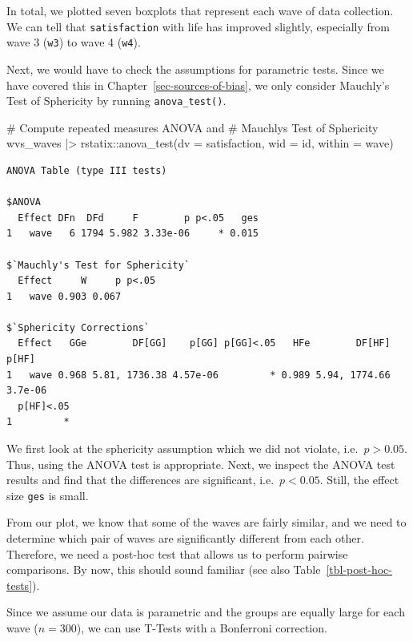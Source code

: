 \documentclass[
  letterpaper,
]{krantz}
\makeatletter
\newenvironment{Shaded}{\begin{snugshade}}{\end{snugshade}}
\newcommand{\AttributeTok}[1]{\textcolor[rgb]{0.40,0.45,0.13}{#1}}
\newcommand{\CommentTok}[1]{\textcolor[rgb]{0.37,0.37,0.37}{#1}}
\newcommand{\FunctionTok}[1]{\textcolor[rgb]{0.28,0.35,0.67}{#1}}
\newcommand{\NormalTok}[1]{\textcolor[rgb]{0.00,0.23,0.31}{#1}}
\newcommand{\SpecialCharTok}[1]{\textcolor[rgb]{0.37,0.37,0.37}{#1}}
\newenvironment{kframe}{%
\medskip{}
\setlength{\fboxsep}{.8em}
 \def\at@end@of@kframe{}%
 \ifinner\ifhmode%
  \def\at@end@of@kframe{\end{minipage}}%
  \begin{minipage}{\columnwidth}%
 \fi\fi%
 \def\FrameCommand##1{\hskip\@totalleftmargin \hskip-\fboxsep
 \colorbox{shadecolor}{##1}\hskip-\fboxsep
     \hskip-\linewidth \hskip-\@totalleftmargin \hskip\columnwidth}%
 \MakeFramed {\advance\hsize-\width
   \@totalleftmargin\z@ \linewidth\hsize
   \@setminipage}}%
 {\par\unskip\endMakeFramed%
 \at@end@of@kframe}
\renewenvironment{Shaded}{\begin{kframe}}{\end{kframe}}
\makeatother
\begin{document}
In total, we plotted seven boxplots that represent each wave of data
collection. We can tell that \texttt{satisfaction} with life has
improved slightly, especially from wave 3 (\texttt{w3}) to wave 4
(\texttt{w4}).

Next, we would have to check the assumptions for parametric tests. Since
we have covered this in Chapter~\ref{sec-sources-of-bias}, we only
consider Mauchly's Test of Sphericity by running \texttt{anova\_test()}.

\begin{Shaded}
\begin{Highlighting}[]
\CommentTok{\# Compute repeated measures ANOVA and}
\CommentTok{\# Mauchly\textquotesingle{}s Test of Sphericity}
\NormalTok{wvs\_waves }\SpecialCharTok{|\textgreater{}}
\NormalTok{  rstatix}\SpecialCharTok{::}\FunctionTok{anova\_test}\NormalTok{(}\AttributeTok{dv =}\NormalTok{ satisfaction,}
                      \AttributeTok{wid =}\NormalTok{ id,}
                      \AttributeTok{within =}\NormalTok{ wave)}
\end{Highlighting}
\end{Shaded}

\begin{verbatim}
ANOVA Table (type III tests)

$ANOVA
  Effect DFn  DFd     F        p p<.05   ges
1   wave   6 1794 5.982 3.33e-06     * 0.015

$`Mauchly's Test for Sphericity`
  Effect     W     p p<.05
1   wave 0.903 0.067      

$`Sphericity Corrections`
  Effect   GGe        DF[GG]    p[GG] p[GG]<.05   HFe        DF[HF]   p[HF]
1   wave 0.968 5.81, 1736.38 4.57e-06         * 0.989 5.94, 1774.66 3.7e-06
  p[HF]<.05
1         *
\end{verbatim}

We first look at the sphericity assumption which we did not violate,
i.e.~\(p > 0.05\). Thus, using the ANOVA test is appropriate. Next, we
inspect the ANOVA test results and find that the differences are
significant, i.e.~\(p < 0.05\). Still, the effect size \texttt{ges} is
small.

From our plot, we know that some of the waves are fairly similar, and we
need to determine which pair of waves are significantly different from
each other. Therefore, we need a post-hoc test that allows us to perform
pairwise comparisons. By now, this should sound familiar (see also
Table~\ref{tbl-post-hoc-tests}).

Since we assume our data is parametric and the groups are equally large
for each wave (\(n = 300\)), we can use T-Tests with a Bonferroni
correction.
\end{document}
